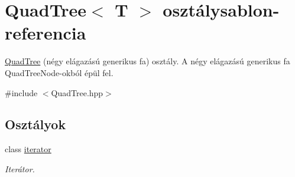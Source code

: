 \hypertarget{class_quad_tree}{\section{Quad\-Tree$<$ T $>$ osztálysablon-\/referencia}
\label{class_quad_tree}
}


\hyperlink{class_quad_tree}{Quad\-Tree} (négy elágazású generikus fa) osztály. A négy elágazású generikus fa Quad\-Tree\-Node-\/okból épül fel.  




{\ttfamily \#include $<$Quad\-Tree.\-hpp$>$}

\subsection*{Osztályok}
\begin{DoxyCompactItemize}
\item 
class \hyperlink{class_quad_tree_1_1iterator}{iterator}
\begin{DoxyCompactList}\small\item\em Iterátor. \end{DoxyCompactList}\end{DoxyCompactItemize}
